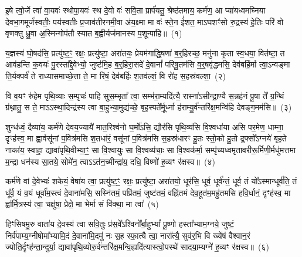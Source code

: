 \setcounter{anuvakam}{0}
इ॒षे त्वो॒र्जे त्वा॑ वा॒यवः॑ स्थोपा॒यवः॑ स्थ दे॒वो वः॑ सवि॒ता प्रार्प॑यतु॒ श्रेष्ठ॑तमाय॒ कर्म॑ण॒ आ प्या॑यध्वमघ्निया देवभा॒गमूर्ज॑स्वतीः॒ पय॑स्वतीः प्र॒जाव॑तीरनमी॒वा अ॑य॒क्ष्मा मा वः॑ स्ते॒न ई॑शत॒ मा\-ऽघशꣳ॑सो रु॒द्रस्य॑ हे॒तिः परि॑ वो वृणक्तु ध्रु॒वा अ॒स्मिन्गोप॑तौ स्यात ब॒ह्वीर्यज॑मानस्य प॒शून्पा॑हि॥~(१)\ip

{\anuvakamend[{इ॒षे त्रिच॑त्वारिꣳशत्}]}

य॒ज्ञस्य॑ घो॒षद॑सि॒ प्रत्यु॑ष्ट॒ꣳ॒ रक्षः॒ प्रत्यु॑ष्टा॒ अरा॑तयः॒ प्रेयम॑गाद्धि॒षणा॑ ब॒र्॒हिरच्छ॒ मनु॑ना कृ॒ता स्व॒धया॒ वित॑ष्टा॒ त आव॑हन्ति क॒वयः॑ पु॒रस्ता᳚द्दे॒वेभ्यो॒ जुष्ट॑मि॒ह ब॒र्॒हिरा॒सदे॑ दे॒वानां᳚ परिषू॒तम॑सि व॒र्॒षवृ॑द्धमसि॒ देव॑बर्\mbox{}हि॒र्मा त्वा॒\-ऽन्वङ्मा ति॒र्यक्पर्व॑ ते राध्यासमाच्छे॒त्ता ते॒ मा रि॑षं॒ देव॑बर्\mbox{}हिः श॒तव॑ल्\mbox{}शं॒ वि रो॑ह स॒हस्र॑वल्\mbox{}शा॒~(२)\ip

वि व॒यꣳ रु॑हेम पृथि॒व्याः स॒म्पृचः॑ पाहि सुस॒म्भृता᳚ त्वा॒ सम्भ॑रा॒म्यदि॑त्यै॒ रास्ना॑\-ऽसीन्द्रा॒ण्यै स॒न्नह॑नं पू॒षा ते᳚ ग्र॒न्थिं ग्र॑थ्नातु॒ स ते॒ मा\-ऽऽ\-स्था॒दिन्द्र॑स्य त्वा बा॒हुभ्या॒मुद्य॑च्छे॒ बृह॒स्पते᳚र्मू॒र्ध्ना ह॑राम्यु॒र्व॑न्तरि॑क्ष॒मन्वि॑हि देवङ्ग॒मम॑सि॥~(३)\ip

{\anuvakamend[{स॒हस्र॑वल्\mbox{}शा अ॒ष्टात्रिꣳ॑शच्च}]}

शुन्ध॑ध्वं॒ दैव्या॑य॒ कर्म॑णे देवय॒ज्यायै॑ मात॒रिश्व॑नो घ॒र्मो॑\-ऽसि॒ द्यौर॑सि पृथि॒व्य॑सि वि॒श्वधा॑या असि पर॒मेण॒ धाम्ना॒ दृꣳह॑स्व॒ मा ह्वा॒र्वसू॑नां प॒वित्र॑मसि श॒तधा॑रं॒ वसू॑नां प॒वित्र॑मसि स॒हस्र॑धारꣳ हु॒तः स्तो॒को हु॒तो द्र॒फ्सो᳚\-ऽग्नये॑ बृह॒ते नाका॑य॒ स्वाहा॒ द्यावा॑\-पृथि॒वीभ्या॒ꣳ॒ सा वि॒श्वायुः॒ सा वि॒श्वव्य॑चाः॒ सा वि॒श्वक॑र्मा॒ सम्पृ॑च्यध्वमृतावरीरू॒र्मिणी॒र्मधु॑मत्तमा म॒न्द्रा धन॑स्य सा॒तये॒ सोमे॑न॒ त्वा\-ऽऽ\-त॑न॒च्मीन्द्रा॑य॒ दधि॒ विष्णो॑ ह॒व्यꣳ र॑क्षस्व॥~(४)\ip

{\anuvakamend[{सोमे॑ना॒ष्टौ च॑}]}

कर्म॑णे वां दे॒वेभ्यः॑ शकेयं॒ वेषा॑य त्वा॒ प्रत्यु॑ष्ट॒ꣳ॒ रक्षः॒ प्रत्यु॑ष्टा॒ अरा॑तयो॒ धूर॑सि॒ धूर्व॒ धूर्व॑न्तं॒ धूर्व॒ तं यो᳚\-ऽस्मान्धूर्व॑ति॒ तं धू᳚र्व॒ यं व॒यं धूर्वा॑म॒स्त्वं दे॒वाना॑मसि॒ सस्नि॑तमं॒ पप्रि॑तमं॒ जुष्ट॑तमं॒ वह्नि॑तमं देव॒हूत॑म॒मह्रु॑तमसि हवि॒र्धानं॒ दृꣳह॑स्व॒ मा ह्वा᳚र्मि॒त्रस्य॑ त्वा॒ चक्षु॑षा॒ प्रेक्षे॒ मा भेर्मा सं वि॑क्था॒ मा त्वा॑~(५)\ip

हिꣳसिषमु॒रु वाता॑य दे॒वस्य॑ त्वा सवि॒तुः प्र॑स॒वे᳚\-ऽश्विनो᳚र्बा॒हु\-भ्यां᳚ पू॒ष्णो हस्ता᳚भ्याम॒ग्नये॒ जुष्टं॒ निर्व॑पाम्य॒ग्नी\-षोमा᳚भ्यामि॒दं दे॒वाना॑मि॒दमु॑ नः स॒ह स्फा॒त्यै त्वा॒ नारा᳚त्यै॒ सुव॑र॒भि वि ख्ये॑षं वैश्वान॒रं ज्योति॒र्दृꣳह॑न्ता॒न्दुर्या॒ द्यावा॑\-पृथि॒व्योरु॒र्व॑न्तरि॑क्ष॒\-मन्वि॒ह्यदि॑त्यास्त्वो॒\-पस्थे॑ सादया॒म्यग्ने॑ ह॒व्यꣳ र॑क्षस्व॥~(६)\ip

